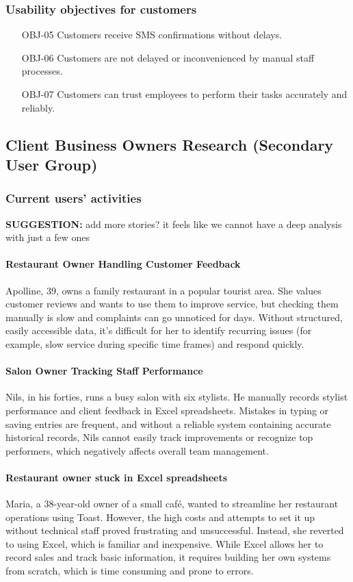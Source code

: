 \documentclass[]{VUMIFTemplateClass}
\newcommand{\todocomment}[1]{%
    \begin{tcolorbox}[colback=red!20, colframe=red!60, arc=0pt, outer arc=0pt, boxrule=1pt, left=3pt, right=3pt, top=3pt, bottom=3pt]
        \textbf{\textcolor{orange!70!black}{TODO:}} #1
    \end{tcolorbox}
}
\newcommand{\suggestioncomment}[1]{%
    \definecolor{lime}{RGB}{50,205,50}%
    \begin{tcolorbox}[colback=lime!15, colframe=lime!60, arc=0pt, outer arc=0pt, boxrule=1pt, left=3pt, right=3pt, top=3pt, bottom=3pt]
        \textbf{\textcolor{lime!70!black}{SUGGESTION:}} #1
    \end{tcolorbox}%
}
\newcommand{\subsubsubsection}[1]{\paragraph{#1}}
\begin{document}
\subsubsection{Usability objectives for customers}
\begin{itemize}
    \item[OBJ-05] Customers receive SMS confirmations without delays.
    \item[OBJ-06] Customers are not delayed or inconvenienced by manual staff processes.
    \item[OBJ-07] Customers can trust employees to perform their tasks accurately and reliably.
\end{itemize}

\subsection{Client Business Owners Research (Secondary User Group)}

\subsubsection{Current users' activities}
\suggestioncomment{add more stories? it feels like we cannot have a deep analysis with just a few ones}

\subsubsubsection{Restaurant Owner Handling Customer Feedback}

Apolline, 39, owns a family restaurant in a popular tourist area. She values customer reviews and wants to use them to improve service, but checking them manually is slow and complaints can go unnoticed for days. Without structured, easily accessible data, it’s difficult for her to identify recurring issues (for example, slow service during specific time frames) and respond quickly.

\subsubsubsection{Salon Owner Tracking Staff Performance}

Nils, in his forties, runs a busy salon with six stylists. He manually records stylist performance and client feedback in Excel spreadsheets. Mistakes in typing or saving entries are frequent, and without a reliable system containing accurate historical records, Nils cannot easily track improvements or recognize top performers, which negatively affects overall team management.

\subsubsubsection{Restaurant owner stuck in Excel spreadsheets}
Maria, a 38-year-old owner of a small café, wanted to streamline her restaurant operations using Toast. However, the high costs and attempts to set it up without technical staff proved frustrating and unsuccessful. Instead, she reverted to using Excel, which is familiar and inexpensive. While Excel allows her to record sales and track basic information, it requires building her own systems from scratch, which is time consuming and prone to errors.
\end{document}
